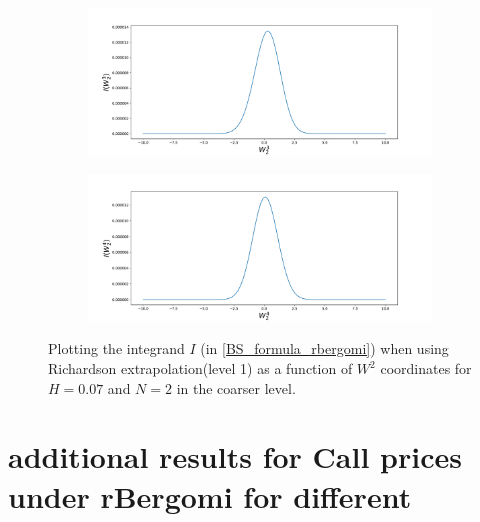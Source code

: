 \documentclass[11pt]{article}
\begin{document}
\begin{figure}[h!]
	\begin{subfigure}[b]{0.4\textwidth}
		\centering
		\includegraphics[width=1\linewidth]{./figures/integrand_richardson_plotting_rBergomi/N_2/W_2/Bergomi_integrand_rich_level1_K_1_H_007_y7f_N_2}
		\caption{}
		\label{fig:sub3}
	\end{subfigure}
	\hfill
	\begin{subfigure}[b]{0.4\textwidth}
		\centering
		\includegraphics[width=1\linewidth]{./figures/integrand_richardson_plotting_rBergomi/N_2/W_2/Bergomi_integrand_rich_level1_K_1_H_007_y8f_N_2}
		\caption{}
		\label{fig:sub4}
	\end{subfigure}
		\caption{Plotting the integrand $I$ (in \eqref{BS_formula_rbergomi}) when using Richardson extrapolation(level 1) as a function of $W^2$ coordinates for $H=0.07$ and $N=2$ in the coarser level.}
	\label{fig:Integrand_rich_level1_H_007_N_2_W_2}
\end{figure}



\newpage

 




\appendix

\newpage
\section{additional results for Call prices under rBergomi for different}
\end{document}
